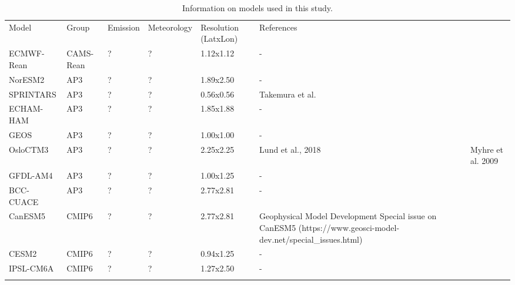\documentclass[journal abbreviation, manuscript]{copernicus}
\begin{document}
\begin{table}
 \begin{tabularx}{\textwidth}{lllllX}
  \tophline
  Model      & Group     & Emission & Meteorology & Resolution (LatxLon) & References                                                                                                                         \\
  \middlehline
  ECMWF-Rean & CAMS-Rean & ?        & ?           & 1.12x1.12            & -                                                                                                                                  \\
  NorESM2    & AP3       & ?        & ?           & 1.89x2.50            & -                                                                                                                                  \\
  SPRINTARS  & AP3       & ?        & ?           & 0.56x0.56            & Takemura et al.                                                                                                                    \\
  ECHAM-HAM  & AP3       & ?        & ?           & 1.85x1.88            & -                                                                                                                                  \\
  GEOS       & AP3       & ?        & ?           & 1.00x1.00            & -                                                                                                                                  \\
  OsloCTM3   & AP3       & ?        & ?           & 2.25x2.25            & Lund et al., 2018                                                                                              & Myhre et al. 2009 \\
  GFDL-AM4   & AP3       & ?        & ?           & 1.00x1.25            & -                                                                                                                                  \\
  BCC-CUACE  & AP3       & ?        & ?           & 2.77x2.81            & -                                                                                                                                  \\
  CanESM5    & CMIP6     & ?        & ?           & 2.77x2.81            & Geophysical Model Development Special issue on CanESM5 (https://www.geosci-model-dev.net/special\_issues.html)                     \\
  CESM2      & CMIP6     & ?        & ?           & 0.94x1.25            & -                                                                                                                                  \\
  IPSL-CM6A  & CMIP6     & ?        & ?           & 1.27x2.50            & -                                                                                                                                  \\
  \bottomhline
 \end{tabularx}
 \caption{Information on models used in this study.}
 \label{models}
\end{table}
\end{document}
